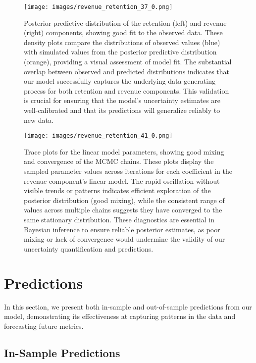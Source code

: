 \documentclass[11pt]{amsart}
\theoremstyle{definition}
\begin{document}
\begin{figure}
    \centering
    \texttt{[image: images/revenue\_retention\_37\_0.png]}
    \caption{Posterior predictive distribution of the retention (left) and revenue (right) components, showing good fit to
        the observed data. These density plots compare the distributions of observed values (blue) with simulated values
        from the posterior predictive distribution (orange), providing a visual assessment of model fit. The substantial
        overlap between observed and predicted distributions indicates that our model successfully captures the
        underlying data-generating process for both retention and revenue components. This validation is crucial for
        ensuring that the model's uncertainty estimates are well-calibrated and that its predictions will generalize
        reliably to new data.}
    \label{fig:posterior_predictive}
\end{figure}

\begin{figure}
    \centering
    \texttt{[image: images/revenue\_retention\_41\_0.png]}
    \caption{Trace plots for the linear model parameters, showing good mixing and convergence of the MCMC chains. These
        plots display the sampled parameter values across iterations for each coefficient in the revenue component's
        linear model. The rapid oscillation without visible trends or patterns indicates efficient exploration of the
        posterior distribution (good mixing), while the consistent range of values across multiple chains suggests they
        have converged to the same stationary distribution. These diagnostics are essential in Bayesian inference to
        ensure reliable posterior estimates, as poor mixing or lack of convergence would undermine the validity of our
        uncertainty quantification and predictions.}
    \label{fig:trace}
\end{figure}


\section{Predictions}

In this section, we present both in-sample and out-of-sample predictions from our model, demonstrating its effectiveness at
capturing patterns in the data and forecasting future metrics.

\subsection{In-Sample Predictions}
\end{document}
